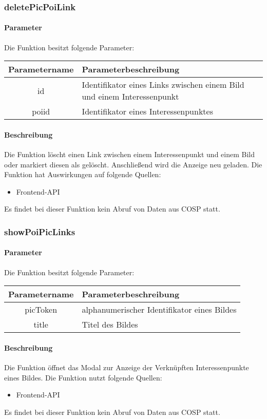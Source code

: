 \subsubsection{deletePicPoiLink}
\paragraph{Parameter} Die Funktion besitzt folgende Parameter:
\begin{table}[H]
	\begin{tabular}{|c|p{11cm}|}
		\hline
		\textbf{Parametername} & \textbf{Parameterbeschreibung} \\ \hline
		id    & Identifikator eines Links zwischen einem Bild und einem Interessenpunkt \\ \hline
		poiid & Identifikator eines Interessenpunktes \\ \hline
	\end{tabular}
\end{table}
\paragraph{Beschreibung} Die Funktion löscht einen Link zwischen einem Interessenpunkt und einem Bild oder markiert diesen als gelöscht. Anschließend wird die Anzeige neu geladen. Die Funktion hat Auswirkungen auf folgende Quellen:
\begin{itemize}
	\item Frontend-API
\end{itemize}
Es findet bei dieser Funktion kein Abruf von Daten aus {\glqq COSP\grqq} statt.
\subsubsection{showPoiPicLinks}
\paragraph{Parameter} Die Funktion besitzt folgende Parameter:
\begin{table}[H]
	\begin{tabular}{|c|p{11cm}|}
		\hline
		\textbf{Parametername} & \textbf{Parameterbeschreibung} \\ \hline
		picToken & alphanumerischer Identifikator eines Bildes \\ \hline
		title    & Titel des Bildes \\ \hline
	\end{tabular}
\end{table}
\paragraph{Beschreibung} Die Funktion öffnet das Modal zur Anzeige der Verknüpften Interessenpunkte eines Bildes. Die Funktion nutzt folgende Quellen:
\begin{itemize}
	\item Frontend-API
\end{itemize}
Es findet bei dieser Funktion kein Abruf von Daten aus {\glqq COSP\grqq} statt.
